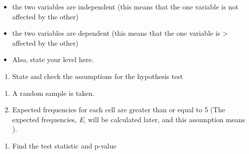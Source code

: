 \documentclass[]{book}
\providecommand{\tightlist}{%
  \setlength{\itemsep}{0pt}\setlength{\parskip}{0pt}}
\begin{document}
\begin{itemize}
\tightlist
\item
  the two variables are independent (this means that the one variable is not affected by the other)
\item
  the two variables are dependent (this means that the one variable is \textgreater{} affected by the other)
\item
  Also, state your level here.
\end{itemize}

\begin{enumerate}
\def\labelenumi{\arabic{enumi}.}
\setcounter{enumi}{1}
\tightlist
\item
  State and check the assumptions for the hypothesis test
\end{enumerate}

\begin{enumerate}
\def\labelenumi{\alph{enumi}.}
\item
  A random sample is taken.
\item
  Expected frequencies for each cell are greater than or equal to 5 (The expected frequencies, \emph{E}, will be calculated later, and this assumption means ).
\end{enumerate}

\begin{enumerate}
\def\labelenumi{\arabic{enumi}.}
\setcounter{enumi}{2}
\tightlist
\item
  Find the test statistic and p-value
\end{enumerate}
\end{document}
